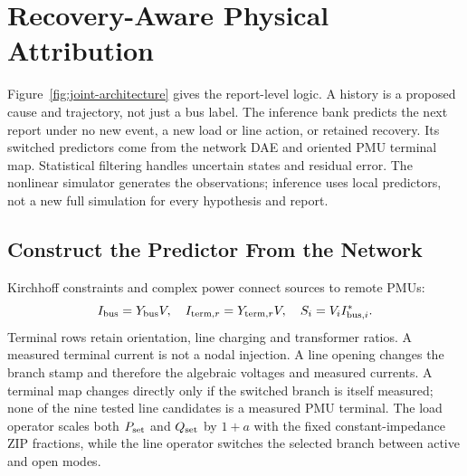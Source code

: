 \section{Recovery-Aware Physical Attribution}
\label{sec:narrative-method}

Figure~\ref{fig:joint-architecture} gives the report-level logic. A
history is a proposed cause and trajectory, not just a bus label. The
inference bank predicts the next report under no new event, a new load or
line action, or retained recovery. Its switched predictors come from the
network DAE and oriented PMU terminal map. Statistical filtering handles
uncertain states and residual error. The nonlinear simulator generates the
observations; inference uses local predictors, not a new full simulation
for every hypothesis and report.

\subsection{Construct the Predictor From the Network}

Kirchhoff constraints and complex power connect sources to remote PMUs:
\begin{equation}
 I_{\rm bus}=Y_{\rm bus}V,\quad
 I_{{\rm term},r}=Y_{{\rm term},r}V,\quad S_i=V_i I_{{\rm bus},i}^{*}.
 \label{eq:narrative-electrical}
\end{equation}
Terminal rows retain orientation, line charging and transformer ratios.
A measured terminal current is not a nodal injection. A line opening
changes the branch stamp and therefore the algebraic voltages and measured
currents. A terminal map changes directly only if the switched branch is
itself measured; none of the nine tested line candidates is a measured PMU
terminal. The load operator scales both $P_{\rm set}$ and $Q_{\rm set}$
by $1+a$ with the fixed constant-impedance ZIP fractions, while the line
operator switches the selected branch between active and open modes.

